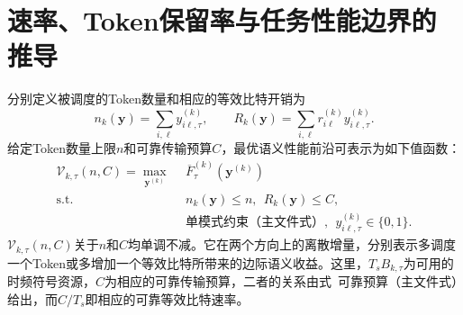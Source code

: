 \documentclass[journal]{IEEEtran}
\begin{document}
\section{速率、Token保留率与任务性能边界的推导}

\noindent


分别定义被调度的Token数量和相应的等效比特开销为
\begin{equation}
n_k(\bm y)=\sum_{i,\ell}y_{i\ell,\tau}^{(k)},
\qquad
R_k(\bm y)=\sum_{i,\ell}r_{i\ell}^{(k)}y_{i\ell,\tau}^{(k)}.
\label{eq:count_and_rate}
\end{equation}
给定Token数量上限$n$和可靠传输预算$C$，最优语义性能前沿可表示为如下值函数：
\begin{equation}
\begin{split}
\mathcal V_{k,\tau}(n,C)
=\max_{\bm y^{(k)}}~~&\overline F_{\tau}^{(k)}(\bm y^{(k)})\\
\mathrm{s.t.}~~&n_k(\bm y)\leq n,~~R_k(\bm y)\leq C,\\
&单模式约束（主文件式）,~~y_{i\ell,\tau}^{(k)}\in\{0,1\}.
\end{split}
\label{eq:semantic_rate_frontier}
\end{equation}
$\mathcal V_{k,\tau}(n,C)$关于$n$和$C$均单调不减。它在两个方向上的离散增量，分别表示多调度一个Token或多增加一个等效比特所带来的边际语义收益。这里，$T_sB_{k,\tau}$为可用的时频符号资源，$C$为相应的可靠传输预算，二者的关系由式~可靠预算（主文件式）给出，而$C/T_s$即相应的可靠等效比特速率。
\end{document}
